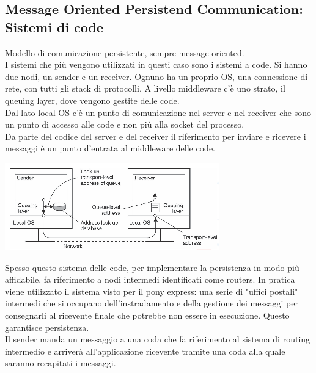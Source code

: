 \subsection{Message Oriented Persistend Communication: Sistemi di code}
Modello di comunicazione persistente, sempre message oriented.\\ I sistemi che più vengono utilizzati in questi caso sono i sistemi a code. Si hanno due nodi, un sender e un receiver. Ognuno ha un proprio OS, una connessione di rete, con tutti gli stack di protocolli. A livello middleware c'è uno strato, il queuing layer, dove vengono gestite delle code. \\
Dal lato local OS c'è un punto di comunicazione nel server e nel receiver che sono un punto di accesso alle code e non più alla socket del processo. \\
Da parte del codice del server e del receiver il riferimento per inviare e ricevere i messaggi è un punto d'entrata al middleware delle code.
\begin{center}
    \includegraphics[width = .7\textwidth]{images/lezione3/message-queue.png}
\end{center}
Spesso questo sistema delle code, per implementare la persistenza in modo più affidabile, fa riferimento a nodi intermedi identificati come routers. In pratica viene utilizzato il sistema visto per il pony express: una serie di "uffici postali" intermedi che si occupano dell'instradamento e della gestione dei messaggi per consegnarli al ricevente finale che potrebbe non essere in esecuzione. Questo garantisce persistenza.\\
Il sender manda un messaggio a una coda che fa riferimento al sistema di routing intermedio e arriverà all'applicazione ricevente tramite una coda alla quale saranno recapitati i messaggi.

